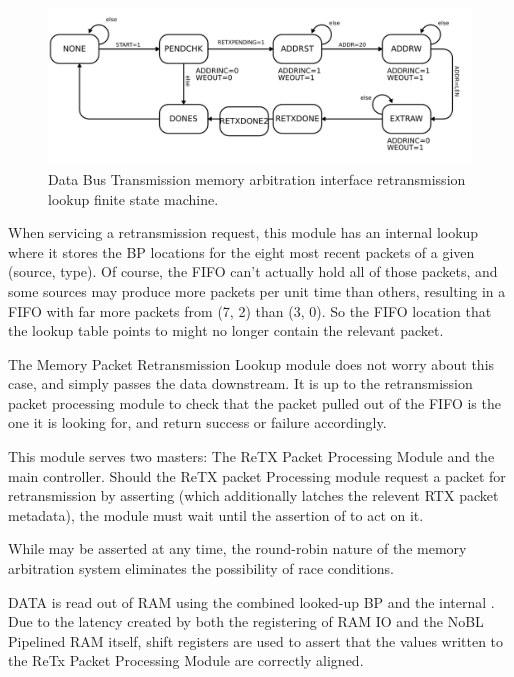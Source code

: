 \begin{figure}
\begin{centering}
\includegraphics[scale=0.8]{memarbit.retx.fsm.svg}
\end{centering}
\caption{Data Bus Transmission memory arbitration interface retransmission lookup finite state machine.}
\label{memarbit.retx.fsm}
\end{figure}

When servicing a retransmission request, this module has an internal
lookup where it stores the BP locations for the eight most recent
packets of a given (source, type). Of course, the FIFO can't actually
hold all of those packets, and some sources may produce more packets
per unit time than others, resulting in a FIFO with far more packets
from (7, 2) than (3, 0). So the FIFO location that the lookup table
points to might no longer contain the relevant packet.

The Memory  Packet Retransmission Lookup  module does not  worry about
this case,  and simply  passes the  data downstream. It  is up  to the
retransmission  packet  processing module  to  check  that the  packet
pulled  out of  the FIFO  is the  one it  is looking  for,  and return
success or failure accordingly.
 

This module serves two masters: The ReTX Packet Processing Module and
the main controller. Should the ReTX packet Processing module request
a packet for retransmission by asserting  (which
additionally latches the relevent RTX packet metadata), the module
must wait until the assertion of  to act on it.

While  may be asserted at any time, the round-robin
nature of the memory arbitration system eliminates the possibility of
race conditions.

DATA is read out of RAM using the combined looked-up BP and the
internal . Due to the latency created by both the
registering of RAM IO and the NoBL Pipelined RAM itself, shift
registers are used to assert that the values written to the ReTx
Packet Processing Module are correctly aligned.


